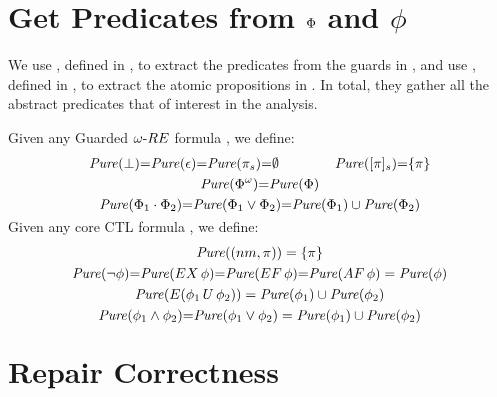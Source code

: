 \documentclass[acmsmall,screen,review,anonymous,nonacm]{acmart}
\begin{document}
\section{Get Predicates from ${\mathrm{\Phi}}$ and $\phi$}


We use , defined in , to extract the predicates from the guards in \code{\effect}, and use 
, defined in ,  to extract the atomic propositions in \code{\phi}. 
In total, they gather all the abstract predicates that of interest in the analysis. 

{\begin{definition}
  \label{def:getPure_effect}
Given any Guarded ${\omega\text{-}RE}$ formula \code{\effect}, 
we define: 
{\small
\begin{gather*}
\mathit{Pure}{(\bot)} {{=}} \mathit{Pure}{(\epsilon)} {{=}}
\mathit{Pure}{(\pi_s)} {{=}}\emptyset
\qquad \qquad 
\mathit{Pure}{([\pi]_s)} {{=}}\{\pi\} 
\\ 
\mathit{Pure}{({\mathrm{\Phi}}^\omega)} {{=}} \mathit{Pure}{({\mathrm{\Phi}})}
\\
\mathit{Pure}{({\mathrm{\Phi}}_1 \cdot {\ensuremath{\mathrm{\Phi}}}_2)} {{=}}
\mathit{Pure}{({\mathrm{\Phi}}_1 \vee {\ensuremath{\mathrm{\Phi}}}_2)} {{=}}
\mathit{Pure}{({\mathrm{\Phi}}_1)} \cup \mathit{Pure}{({\mathrm{\Phi}}_2)}
\\[-0.9em]
\end{gather*}
}
\end{definition}
}
{\begin{definition}
  \label{def:getPure_CTL}
Given any core CTL formula \code{\phi}, 
we define: 
{\small
\begin{gather*}
\mathit{Pure}{((nm, \pi))} = \{\pi\} 
\\
\mathit{Pure}{(\neg\phi)}{=}  
\mathit{Pure}{(EX\,\phi)}{=}\mathit{Pure}{(EF\,\phi)}{=}\mathit{Pure}{(AF\,\phi)} = \mathit{Pure}(\phi)  
\\   
\mathit{Pure}{(E(\phi_1 \,U\, \phi_2))}  = \mathit{Pure}(\phi_1) \cup  \mathit{Pure}(\phi_2)
\\   
\mathit{Pure}{(\phi_1 \wedge \phi_2)}{=}\mathit{Pure}{(\phi_1 \vee \phi_2)} = \mathit{Pure}(\phi_1) \cup  \mathit{Pure}(\phi_2)
\\[-0.9em]
\end{gather*}
}
\end{definition}
}




\section{Repair Correctness}
\end{document}
